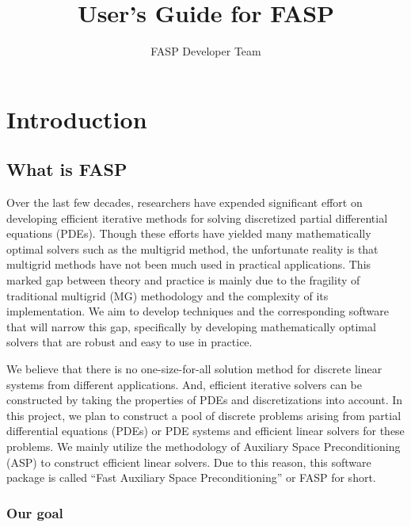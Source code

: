 \documentclass[11pt]{memoir}
\title{User's Guide for FASP}
\author{FASP Developer Team}
\begin{document}
\maketitle

\newpage
\tableofcontents

\chapter{Introduction}\label{ch:intro}

\section{What is FASP}\label{sec:goal}

Over the last few decades, researchers have expended significant effort on developing efficient iterative methods for solving discretized partial differential equations (PDEs). Though these efforts have yielded many mathematically optimal solvers such as the multigrid method, the unfortunate reality is that multigrid methods have not been much used in practical applications. This marked gap between theory and practice is mainly due to the fragility of traditional multigrid (MG) methodology and the complexity of its implementation. We aim to develop techniques and the corresponding software that will narrow this gap, specifically by developing mathematically optimal solvers that are robust and easy to use in practice. 

We believe that there is no one-size-for-all solution method for discrete linear systems from different applications. And, efficient iterative solvers can be constructed by taking the properties of PDEs and discretizations into account. In this project, we plan to construct a pool of discrete problems arising from partial differential equations (PDEs) or PDE systems and efficient linear solvers for these problems. We mainly utilize the methodology of Auxiliary Space Preconditioning (ASP) to construct efficient linear solvers. Due to this reason, this software package is called ``Fast Auxiliary Space Preconditioning'' or FASP for short. 

\subsection{Our goal}
\end{document}
